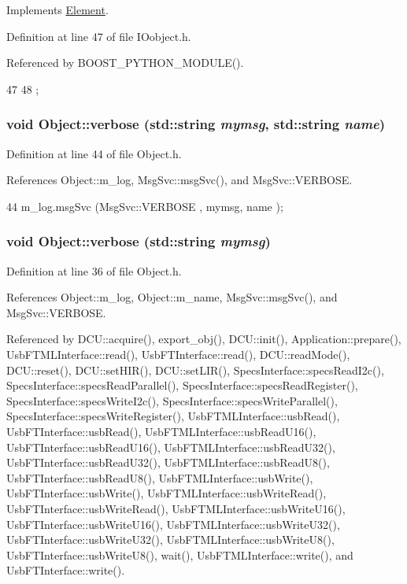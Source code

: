 Implements \hyperlink{classElement_a4e6c83efae95616ebddd03c793a26661}{Element}.

Definition at line 47 of file IOobject.h.

Referenced by BOOST\_\-PYTHON\_\-MODULE().


\begin{DoxyCode}
47                 {
48   };
\end{DoxyCode}
\hypertarget{classObject_a2d4120195317e2a3c6532e8bb9f3da68}{
\subsubsection[{verbose}]{\setlength{\rightskip}{0pt plus 5cm}void Object::verbose (std::string {\em mymsg}, \/  std::string {\em name})}}
\label{classObject_a2d4120195317e2a3c6532e8bb9f3da68}


Definition at line 44 of file Object.h.

References Object::m\_\-log, MsgSvc::msgSvc(), and MsgSvc::VERBOSE.


\begin{DoxyCode}
44 { m_log.msgSvc (MsgSvc::VERBOSE , mymsg, name ); }
\end{DoxyCode}
\hypertarget{classObject_a83d2db2df682907ea1115ad721c1c4a1}{
\subsubsection[{verbose}]{\setlength{\rightskip}{0pt plus 5cm}void Object::verbose (std::string {\em mymsg})}}
\label{classObject_a83d2db2df682907ea1115ad721c1c4a1}


Definition at line 36 of file Object.h.

References Object::m\_\-log, Object::m\_\-name, MsgSvc::msgSvc(), and MsgSvc::VERBOSE.

Referenced by DCU::acquire(), export\_\-obj(), DCU::init(), Application::prepare(), UsbFTMLInterface::read(), UsbFTInterface::read(), DCU::readMode(), DCU::reset(), DCU::setHIR(), DCU::setLIR(), SpecsInterface::specsReadI2c(), SpecsInterface::specsReadParallel(), SpecsInterface::specsReadRegister(), SpecsInterface::specsWriteI2c(), SpecsInterface::specsWriteParallel(), SpecsInterface::specsWriteRegister(), UsbFTMLInterface::usbRead(), UsbFTInterface::usbRead(), UsbFTMLInterface::usbReadU16(), UsbFTInterface::usbReadU16(), UsbFTMLInterface::usbReadU32(), UsbFTInterface::usbReadU32(), UsbFTMLInterface::usbReadU8(), UsbFTInterface::usbReadU8(), UsbFTMLInterface::usbWrite(), UsbFTInterface::usbWrite(), UsbFTMLInterface::usbWriteRead(), UsbFTInterface::usbWriteRead(), UsbFTMLInterface::usbWriteU16(), UsbFTInterface::usbWriteU16(), UsbFTMLInterface::usbWriteU32(), UsbFTInterface::usbWriteU32(), UsbFTMLInterface::usbWriteU8(), UsbFTInterface::usbWriteU8(), wait(), UsbFTMLInterface::write(), and UsbFTInterface::write().


